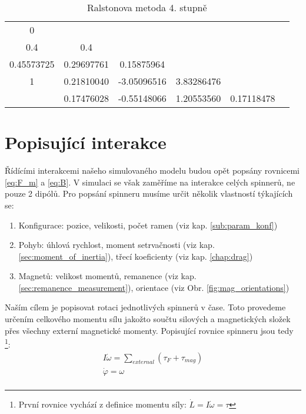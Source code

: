 \documentclass[12pt, a4paper,
 twoside,        %
 openright
]{report}
\begin{document}
\begin{table}[H]
    \hfill
    \parbox{.8\linewidth}{
        \centering
        \caption[Butcherova tabulka Ralstonovy metody 4. stupně]{Ralstonova metoda 4. stupně}
        \begin{tabular}{c | c c c c c}
            0 & \\
            0.4 & 0.4\\
            0.45573725 & 0.29697761 & 0.15875964\\
            1 & 0.21810040 & -3.05096516 & 3.83286476\\
            \hline
            & 0.17476028 & -0.55148066 & 1.20553560 & 0.17118478 \\
        \end{tabular}
    }
    \hfill
\end{table}

\section{Popisující interakce}
Řídícími interakcemi našeho simulovaného modelu budou opět popsány rovnicemi \ref{eq:F_m} a \ref{eq:B}. V simulaci se však zaměříme na interakce celých spinnerů, ne pouze 2 dipólů. Pro popsání spinneru musíme určit několik vlastností týkajících se:
\begin{enumerate}[topsep=0pt, partopsep=0pt]
    \setlength{\itemsep}{0pt}%
    \setlength{\parskip}{0pt}%
    \item Konfigurace: pozice, velikosti, počet ramen (viz kap. \ref{sub:param_konf})
    \item Pohyb: úhlová rychlost, moment setrvačnosti (viz kap. \ref{sec:moment_of_inertia}), třecí koeficienty (viz kap. \ref{chap:drag})
    \item Magnetů: velikost momentů, remanence (viz kap. \ref{sec:remanence_measurement}), orientace (viz Obr. \ref{fig:mag_orientations})
\end{enumerate}

Naším cílem je popisovat rotaci jednotlivých spinnerů v čase. Toto provedeme určením celkového momentu sílu jakožto součtu silových a magnetických složek přes všechny externí magnetické momenty. Popisující rovnice spinneru jsou tedy \footnote{První rovnice vychází z definice momentu síly: $\dot{L} = I \dot{\omega} = \tau$}:
\begin{equation}
    \label{eq:sim_equations}
    \begin{gathered}
        I\dot{\omega} = \sum_{external} (\tau_F + \tau_{mag}) \\
        \dot{\varphi} = \omega \\
    \end{gathered}
\end{equation}
\end{document}
